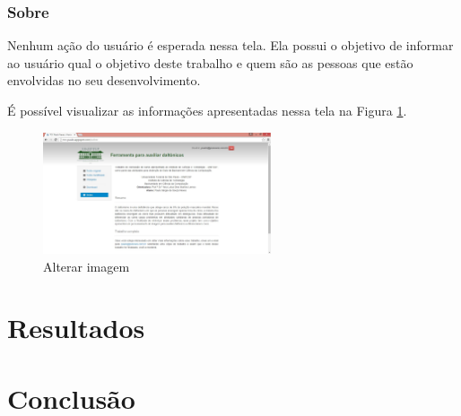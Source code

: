 \documentclass[	12pt, Times, openright, twoside, a4paper, english, brazil]{abntex2}
\begin{document}
\subsection{Sobre}

Nenhum ação do usuário é esperada nessa tela. Ela possui o objetivo de informar ao usuário qual o objetivo deste trabalho e quem são as pessoas que estão envolvidas no seu desenvolvimento.

É possível visualizar as informações apresentadas nessa tela na Figura \ref{fig:figuraSobre}.

\begin{figure}[!htb]
\centering \includegraphics[width=0.6\textwidth]{telaSobre.jpg}
\caption{Alterar imagem} \label{fig:figuraSobre}
\end{figure}

\chapter{Resultados}

\chapter{Conclusão}
\postextual


%


%
%

\end{document}
